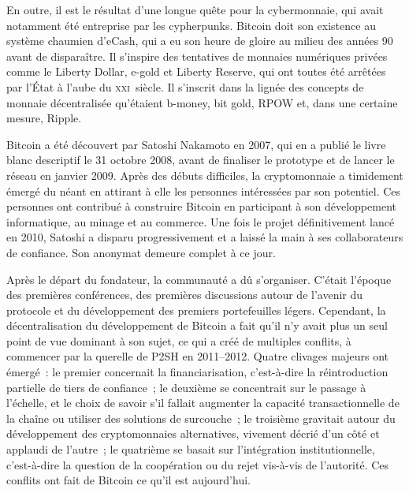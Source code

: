 En outre, il est le résultat d'une longue quête pour la cybermonnaie, qui avait notamment été entreprise par les cypherpunks. Bitcoin doit son existence au système chaumien d'eCash, qui a eu son heure de gloire au milieu des années 90 avant de disparaître. Il s'inspire des tentatives de monnaies numériques privées comme le Liberty Dollar, e-gold et Liberty Reserve, qui ont toutes été arrêtées par l'État à l'aube du \textsc{xxi}\ieme{}~siècle. Il s'inscrit dans la lignée des concepts de monnaie décentralisée qu'étaient b-money, bit gold, RPOW et, dans une certaine mesure, Ripple.

Bitcoin a été découvert par Satoshi Nakamoto en 2007, qui en a publié le livre blanc descriptif le 31 octobre 2008, avant de finaliser le prototype et de lancer le réseau en janvier 2009. Après des débuts difficiles, la cryptomonnaie a timidement émergé du néant en attirant à elle les personnes intéressées par son potentiel. Ces personnes ont contribué à construire Bitcoin en participant à son développement informatique, au minage et au commerce. Une fois le projet définitivement lancé en 2010, Satoshi a disparu progressivement et a laissé la main à ses collaborateurs de confiance. Son anonymat demeure complet à ce jour.

Après le départ du fondateur, la communauté a dû s'organiser. C'était l'époque des premières conférences, des premières discussions autour de l'avenir du protocole et du développement des premiers portefeuilles légers. Cependant, la décentralisation du développement de Bitcoin a fait qu'il n'y avait plus un seul point de vue dominant à son sujet, ce qui a créé de multiples conflits, à commencer par la querelle de P2SH en 2011--2012. Quatre clivages majeurs ont émergé~: le premier concernait la financiarisation, c'est-à-dire la réintroduction partielle de tiers de confiance~; le deuxième se concentrait sur le passage à l'échelle, et le choix de savoir s'il fallait augmenter la capacité transactionnelle de la chaîne ou utiliser des solutions de surcouche~; le troisième gravitait autour du développement des cryptomonnaies alternatives, vivement décrié d'un côté et applaudi de l'autre~; le quatrième se basait sur l'intégration institutionnelle, c'est-à-dire la question de la coopération ou du rejet vis-à-vis de l'autorité. Ces conflits ont fait de Bitcoin ce qu'il est aujourd'hui.


